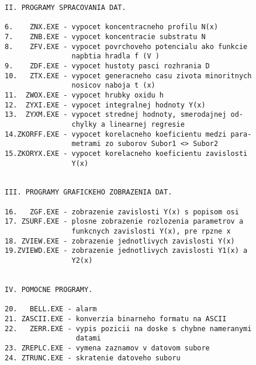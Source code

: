 \begin{verbatim}
II. PROGRAMY SPRACOVANIA DAT.

6.    ZNX.EXE - vypocet koncentracneho profilu N(x)
7.    ZNB.EXE - vypocet koncentracie substratu N
8.    ZFV.EXE - vypocet povrchoveho potencialu ako funkcie 
                napbtia hradla f (V )
9.    ZDF.EXE - vypocet hustoty pasci rozhrania D
10.   ZTX.EXE - vypocet generacneho casu zivota minoritnych 
                nosicov naboja t (x)
11.  ZWOX.EXE - vypocet hrubky oxidu h
12.  ZYXI.EXE - vypocet integralnej hodnoty Y(x)
13.  ZYXM.EXE - vypocet strednej hodnoty, smerodajnej od-
                chylky a linearnej regresie
14.ZKORFF.EXE - vypocet korelacneho koeficientu medzi para-
                metrami zo suborov Subor1 <> Subor2
15.ZKORYX.EXE - vypocet korelacneho koeficientu zavislosti
                Y(x)


III. PROGRAMY GRAFICKEHO ZOBRAZENIA DAT.

16.   ZGF.EXE - zobrazenie zavislosti Y(x) s popisom osi
17. ZSURF.EXE - plosne zobrazenie rozlozenia parametrov a
                funkcnych zavislosti Y(x), pre rpzne x
18. ZVIEW.EXE - zobrazenie jednotlivych zavislosti Y(x)
19.ZVIEWD.EXE - zobrazenie jednotlivych zavislosti Y1(x) a
                Y2(x)


IV. POMOCNE PROGRAMY.

20.   BELL.EXE - alarm
21. ZASCII.EXE - konverzia binarneho formatu na ASCII
22.   ZERR.EXE - vypis pozicii na doske s chybne nameranymi
                 datami
23. ZREPLC.EXE - vymena zaznamov v datovom subore
24. ZTRUNC.EXE - skratenie datoveho suboru
\end{verbatim}
